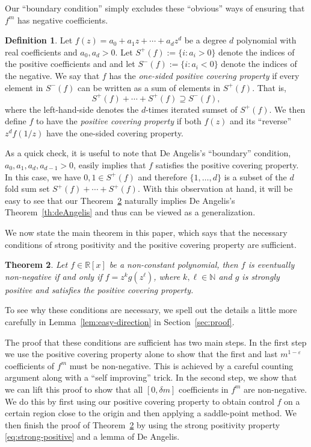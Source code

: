 \documentclass{daj}
\def\eps{\varepsilon}
\newcommand{\R}{\mathbb{R}}
\def\N{\mathbb{N}}
\newtheorem{theorem}{Theorem}
\theoremstyle{definition}
\newtheorem{definition}[theorem]{Definition}
\theoremstyle{remark}
\begin{document}
Our ``boundary condition'' simply excludes these ``obvious'' ways of ensuring that $f^m$ has negative coefficients. 

\begin{definition}
Let $f(z) = a_0 + a_1 z + \cdots + a_d z^d$ be a degree $d$ polynomial with real coefficients and $a_0,a_d > 0$. Let $S^+(f) := \{ i : a_i >0\}$ denote the
indices of the positive coefficients and and let $S^{-}(f) := \{ i : a_i <0 \}$ denote the indices of the negative. We say that $f$ has the 
\emph{one-sided positive covering property} if every element in $S^-(f)$ can be written as a sum of elements in $S^+(f)$. That is,
\[ S^+(f) + \cdots + S^+(f) \supseteq S^-(f), \]
where the left-hand-side denotes the $d$-times iterated sumset of $S^+(f)$.
We then define $f$ to have the \emph{positive covering property} if both $f(z)$ and its ``reverse'' $z^df(1/z)$ have the one-sided covering property.
\end{definition}

As a quick check, it is useful to note that De Angelis's ``boundary'' condition, $a_0,a_1,a_d,a_{d-1} >0$, easily implies that $f$ satisfies the 
positive covering property. In this case, we have $0,1 \in S^{+}(f)$ and therefore $\{1,\ldots, d\}$ is a subset of the $d$ fold sum set $S^+(f) + \cdots + S^+(f)$.
With this observation at hand, it will be easy to see that our Theorem~\ref{thm:main} naturally implies De Angelis's Theorem~\ref{th:deAngelis} and thus can be viewed as a generalization.

We now state the main theorem in this paper, which says that the necessary conditions of strong positivity and the positive covering property
are sufficient.

\begin{theorem} \label{thm:main}
Let $f \in \R[x]$ be a non-constant polynomial, then $f$ is eventually non-negative if and only if $f = z^{k}g(z^{\ell})$, where $k, \ell \in \N$ and $g$ is strongly positive and satisfies the positive covering property. 
\end{theorem}

To see why these conditions are necessary, we spell out the details a little more carefully in Lemma~\ref{lem:easy-direction} in Section~\ref{sec:proof}.

The proof that these conditions are sufficient has two main steps. In the first step we use the positive covering property alone to show that the first and last $m^{1-\eps}$ coefficients of $f^m$ must be non-negative. This is achieved by a careful counting argument along with a ``self improving'' trick. In the second step, we show that we can lift this proof to show that all $[0,\delta m]$ coefficients in $f^m$ are non-negative. We do this by first using our positive covering property to obtain control $f$ on a certain region close to the origin and then applying a saddle-point method. We then finish the proof of Theorem~\ref{thm:main} by using the strong positivity property \eqref{eq:strong-positive} and a lemma of De Angelis.
\end{document}
